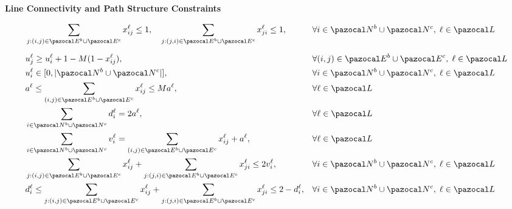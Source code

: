 \documentclass[3p,times,procedia]{elsarticle}
\begin{document}
\textbf{Line Connectivity and Path Structure Constraints}

\begin{align}
& \sum_{j:(i,j) \in \pazocal E^b \cup \pazocal E^c} x_{ij}^\ell \leq 1,
\quad
\sum_{j:(j,i) \in \pazocal E^b \cup \pazocal E^c} x_{ji}^\ell \leq 1,
&& \forall i \in \pazocal N^b \cup \pazocal N^c,\; \ell \in \pazocal L
\label{eq:lc1} \\[6pt]
& u_{j}^\ell \geq u_{i}^\ell + 1 - M(1 - x_{ij}^\ell),
&& \forall (i,j) \in \pazocal E^b \cup \pazocal E^c,\; \ell \in \pazocal L 
\label{eq:lc5} \\
& u_{i}^\ell \in [0, |\pazocal N^b \cup \pazocal N^c|], 
&& \forall i \in \pazocal N^b \cup \pazocal N^c,\; \ell \in \pazocal L 
\label{eq:lc6} \\
& a^\ell \leq \sum_{(i,j) \in \pazocal E^b \cup \pazocal E^c} x_{ij}^\ell
\leq M a^\ell,
&& \forall \ell \in \pazocal L
\label{eq:lc0} \\
& \sum_{i \in \pazocal N^b \cup \pazocal N^c} d_{i}^\ell = 2a^\ell,
&& \forall \ell \in \pazocal L
\label{eq:lc7} \\
& \sum_{i \in \pazocal N^b \cup \pazocal N^c} v_{i}^\ell
   = \sum_{(i,j) \in \pazocal E^b \cup \pazocal E^c} x_{ij}^\ell + a^\ell,
&& \forall \ell \in \pazocal L
\label{eq:lc8} \\
& \sum_{j:(i,j) \in \pazocal E^b \cup \pazocal E^c} x_{ij}^\ell 
   + \sum_{j:(j,i) \in \pazocal E^b \cup \pazocal E^c} x_{ji}^\ell \leq 2v_i^\ell, 
&& \forall i \in \pazocal N^b \cup \pazocal N^c,\; \ell \in \pazocal L 
\label{eq:lc9} \\
& d_i^\ell \leq \sum_{j:(i,j) \in \pazocal E^b \cup \pazocal E^c} x_{ij}^\ell
   + \sum_{j:(j,i) \in \pazocal E^b \cup \pazocal E^c} x_{ji}^\ell \leq 2 - d_i^\ell,
&& \forall i \in \pazocal N^b \cup \pazocal N^c,\; \ell \in \pazocal L
\label{eq:lc10}
\end{align}
\end{document}
